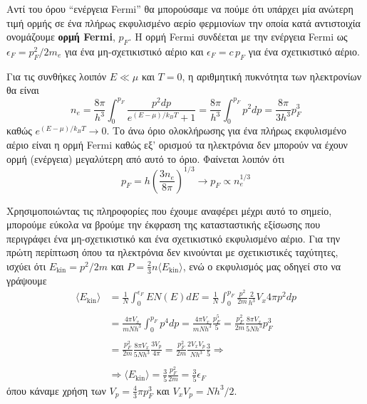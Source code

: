 Αντί του όρου ``ενέργεια Fermi'' θα μπορούσαμε να πούμε ότι υπάρχει μία ανώτερη τιμή ορμής σε ένα πλήρως εκφυλισμένο αερίο φερμιονίων την οποία κατά αντιστοιχία ονομάζουμε \textbf{ορμή Fermi}, $p_F$. Η ορμή Fermi συνδέεται με την ενέργεια Fermi ως $\epsilon_F = p_F^2 / 2m_e$ για ένα μη-σχετικιστικό αέριο και $\epsilon_F = c\,p_F$ για ένα σχετικιστικό αέριο.

Για τις συνθήκες λοιπόν $E \ll \mu$ και $T = 0$, η αριθμητική πυκνότητα των ηλεκτρονίων θα είναι
\begin{equation}
    \label{apx:electron_number_density_degenerate_gas}
    n_e = \frac{8\pi}{h^3} \int_0^{p_F} \frac{p^2 dp}{e^{(E - \mu)/k_B T} + 1} = \frac{8\pi}{h^3} \int_0^{p_F} p^2 dp = \frac{8\pi}{3h^3} p_F^3
\end{equation}
καθώς $e^{(E - \mu)/k_B T} \rightarrow 0$. Το άνω όριο ολοκλήρωσης για ένα πλήρως εκφυλισμένο αέριο είναι η ορμή Fermi καθώς εξ' ορισμού τα ηλεκτρόνια δεν μπορούν να έχουν ορμή (ενέργεια) μεγαλύτερη από αυτό το όριο. Φαίνεται λοιπόν ότι
\begin{equation}
    \label{apx:eq:fermi_momentum}
    p_F = h \left( \frac{3 n_e}{8 \pi} \right)^{1/3} \longrightarrow p_F \propto n_e^{1/3}
\end{equation}

Χρησιμοποιώντας τις πληροφορίες που έχουμε αναφέρει μέχρι αυτό το σημείο, μπορούμε εύκολα να βρούμε την έκφραση της κατασταστικής εξίσωσης που περιγράφει ένα μη-σχετικιστικό και ένα σχετικιστικό εκφυλισμένο αέριο.
Για την πρώτη περίπτωση όπου τα ηλεκτρόνια δεν κινούνται με σχετικιστικές ταχύτητες, ισχύει ότι $E_\text{kin} = p^2 / 2m$ και $P = \frac{2}{3}n \langle E_\text{kin} \rangle$, ενώ ο εκφυλισμός μας οδηγεί στο να γράψουμε
\begin{align*}
    \langle E_\text{kin} \rangle &= \frac{1}{N} \int_0^{\epsilon_F} E N(E) dE = \frac{1}{N} \int_0^{p_F} \frac{p^2}{2m} \frac{2}{h^3} V_x 4\pi p^2 dp \\\\
    &= \frac{4\pi V_x}{m N h^3} \int_0^{p_F} p^4 dp = \frac{4\pi V_x}{m N h^3} \frac{p_F^5}{5} = \frac{p_F^2}{2m} \frac{8\pi V_x}{5Nh^3} p_F^3 \\\\
    &= \frac{p_F^2}{2m} \frac{8\pi V_x}{5Nh^3} \frac{3 V_p}{4\pi} = \frac{p_F^2}{2m} \frac{2 V_x V_p}{Nh^3} \frac{3}{5} \Rightarrow \\\\
    &\Rightarrow \langle E_{\text{kin}} \rangle = \frac{3}{5} \frac{p_F^2}{2m} = \frac{3}{5} \epsilon_F
\end{align*}
όπου κάναμε χρήση των $V_p = \frac{4}{3} \pi p_F^3$ και $V_x V_p = N h^3/2$. 

